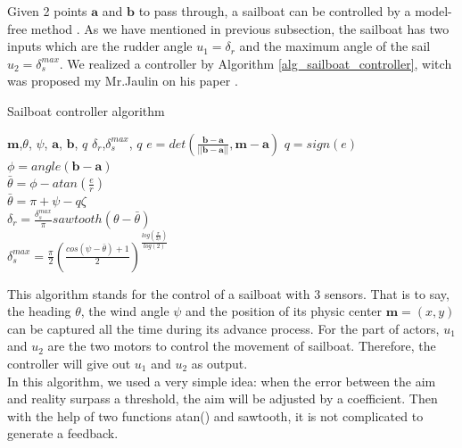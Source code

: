 \documentclass[a4paper]{report}
\begin{document}
Given 2 points $\mathbf{a}$ and $\mathbf{b}$ to pass through, a sailboat can be controlled by a model-free method \cite{robmob}\cite{Jaulin2013}. As we have mentioned in previous subsection, the sailboat has two inputs which are the rudder angle $u_1 = \delta_r$ and the maximum angle of the sail $u_2 =\delta_s^{max}$. We realized a controller by Algorithm \ref{alg_sailboat_controller}, witch was proposed my Mr.Jaulin on his paper \cite{jaulin2013interval}.\\

\begin{algorithm}

\centering
\caption{Sailboat controller algorithm}
\label{alg_sailboat_controller}
\begin{algorithmic}[1] %
\REQUIRE $\mathbf{m}$,$\theta$, $\psi$, $\mathbf{a}$, $\mathbf{b}$, $q$
\ENSURE $\delta_r$,$\delta_s^{max}$, $q$
\STATE $e=det(\frac{\mathbf{b}-\mathbf{a}}{||\mathbf{b}-\mathbf{a}||},\mathbf{m}-\mathbf{a})$
	\STATE $q=sign(e)$ \\
\ENDIF
\STATE $\phi=angle(\mathbf{b}-\mathbf{a})$\\
\STATE $\bar{\theta}=\phi-atan(\frac{e}{r})$\\
	\STATE $\bar{\theta}=\pi+\psi-q\zeta$ \\
\ENDIF
\STATE $\delta_r=\frac{\delta_s^{max}}{\pi}sawtooth(\theta-\bar{\theta})$\\
\STATE $\delta_s^{max}=\frac{\pi}{2}(\frac{cos(\psi-\bar{\theta})+1}{2})^\frac{log(\frac{\pi}{2\beta})}{log(2)}$\\

\end{algorithmic} 
\end{algorithm}

This algorithm stands for the control of a sailboat with 3 sensors. That is to say, the heading $\theta$, the wind angle $\psi$ and the position of its physic center $\mathbf{m}=(x,y)$ can be captured all the time during its advance process. For the part of actors, $u_1$ and $u_2$ are the two motors to control the movement of sailboat. Therefore, the controller will give out $u_1$ and $u_2$ as output.\\

In this algorithm, we used a very simple idea: when the error between the aim and reality surpass a threshold, the aim will be adjusted by a coefficient. Then with the help of two functions atan() and sawtooth, it is not complicated to generate a feedback.\\
\end{document}
